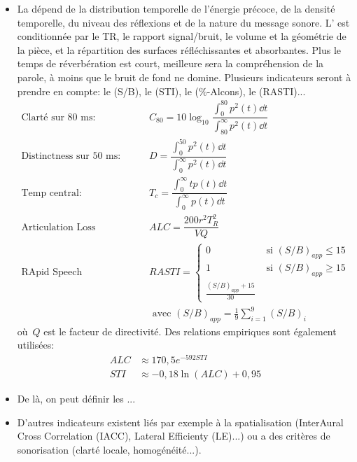 {\begin{itemize}
   \item La  dépend de la distribution temporelle de l'énergie précoce, de la densité temporelle, du niveau des réflexions et de la nature du message sonore. 
   L' est conditionnée par le TR, le rapport signal/bruit, le volume et la géométrie de la pièce, et la répartition des surfaces réfléchissantes et absorbantes.
   Plus le temps de réverbération est court, meilleure sera la compréhension de la parole, à moins que le bruit de fond ne domine.
   Plusieurs indicateurs seront à prendre en compte: le  (S/B), le  (STI), le  (\%-Alcons), le  (RASTI)...
   \begin{align*}
   \text{Clarté sur 80~ms: } & C_{80}=10\log_{10}\dfrac{\int_0^{80}p^2(t)\dd t}{\int_{80}^\infty p^2(t)\dd t}\\
   \text{Distinctness sur 50~ms: } & D = \dfrac{\int_0^{50}p^2(t)\dd t}{\int_{0}^\infty p^2(t)\dd t}\\
   \text{Temp central: } & T_c = \dfrac{\int_0^\infty tp(t)\dd t}{\int_0^\infty p(t)\dd t}\\
   \text{Articulation Loss Consonent: } & ALC=\dfrac{200 r^2T_R^2}{VQ}\\
   \text{RApid Speech Transmission Index: } & RASTI =
   \left\{\begin{array}{ll}
   0 & \text{ si } (S/B)_{app}\le 15\\
   1 & \text{ si } (S/B)_{app}\ge 15\\
   \frac{(S/B)_{app}+15}{30}
   \end{array}
   \right.\\
   & \text{ avec } (S/B)_{app}=\frac19\sum_{i=1}^9 (S/B)_i
   \end{align*}
   où~$Q$ est le facteur de directivité.   
   Des relations empiriques sont également utilisées:
   \begin{align*}
    ALC &\approx 170,5 e^{-592 STI} \\
    STI &\approx -0,18 \ln(ALC) + 0,95
   \end{align*}

   \item De là, on peut définir les ...
   
   \item D'autres indicateurs existent liés par exemple à la spatialisation (InterAural Cross Correlation (IACC), Lateral Efficienty (LE)...) ou a des critères de sonorisation (clarté locale, homogénéité...).
   

\end{itemize}}
